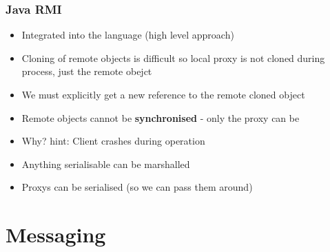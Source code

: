 \documentclass{beamer}
\begin{document}
      \begin{frame}
      	\frametitle{Java RMI}
      	\begin{itemize}
      		\item Integrated into the language (high level approach)
      		\item Cloning of remote objects is difficult so local proxy is not cloned during process, just the remote obejct
      		\item We must explicitly get a new reference to the remote cloned object
      		\item Remote objects cannot be \textbf{synchronised} - only the proxy can be
      		\item Why? hint: Client crashes during operation
      		\item Anything serialisable can be marshalled
      		\item Proxys can be serialised (so we can pass them around)
      	\end{itemize}
      \end{frame}          
\section{Messaging}
\end{document}
